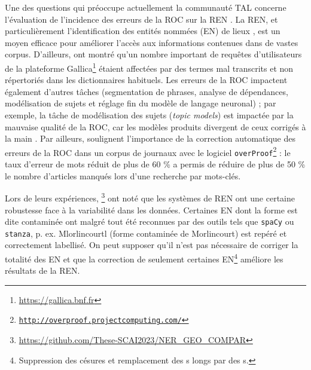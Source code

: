 Une des questions qui préoccupe actuellement la communauté TAL concerne l’évaluation de l’incidence des erreurs de la ROC sur la REN \cite{chiron:hal-03025508,hamdi:hal-03026931,DBLP:journals/corr/abs-2302-10204}. %
La REN, et particulièrement l’identification des entités nommées (EN) de lieux \cite{vanStrien-2020}, est un moyen efficace pour améliorer l’accès aux informations contenues dans de vastes corpus.
D'ailleurs,  ont montré qu'un nombre important de requêtes d'utilisateurs de la plateforme Gallica\footnote{\url{https://gallica.bnf.fr}} étaient affectées par des termes mal transcrits et non répertoriés dans les dictionnaires habituels. 
Les erreurs de la ROC impactent également d'autres tâches (segmentation de phrases, analyse de dépendances, modélisation de sujets et réglage fin du modèle de langage neuronal) ; par exemple, la tâche de modélisation des sujets (\textit{topic models}) est impactée par la mauvaise qualité de la ROC, car les modèles produits divergent de ceux corrigés à la main \cite{vanStrien-2020}.
Par ailleurs,  soulignent l'importance de la correction automatique des erreurs de la ROC dans un corpus de journaux avec le logiciel \texttt{overProof\footnote{\url{http://overproof.projectcomputing.com/}}} : le taux d'erreur de mots réduit de plus de 60 \% a permis de réduire de plus de 50 \% le nombre d'articles manqués lors d'une recherche par mots-clés.

Lors de leurs expériences, \footnote{\url{https://github.com/These-SCAI2023/NER_GEO_COMPAR}} 
ont noté que les systèmes de REN ont une certaine robustesse face à la variabilité dans les données. Certaines EN dont la forme est dite \og{}contaminée\fg{} \cite{hamdi:hal-03615997} ont malgré tout été reconnues par des outils tels que \texttt{spaCy} ou \texttt{stanza}, p. ex. \og{}Mlorlincourtl\fg{} (forme contaminée de \og{}Morlincourt\fg{})  est repéré et correctement labellisé. On peut supposer qu'il n'est pas nécessaire de corriger la totalité des EN et que la correction de seulement certaines EN\footnote{Suppression des césures et remplacement des \og{}s longs\fg{} par des \og{}s\fg{}.} \cite{DBLP:conf/konvens/AlexGKT12} améliore les résultats de la REN. 

